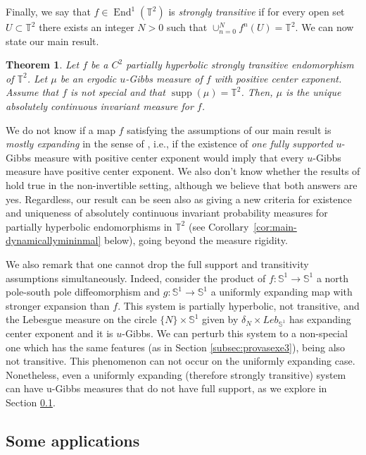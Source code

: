 \documentclass[a4paper,11pt,reqno]{amsart}
\newcommand{\TT}{{\mathbb{T}^2}}
\newtheorem{maintheorem}{Theorem}
\theoremstyle{definition}
\begin{document}
Finally, we say that $f\in\operatorname{End}^1(\TT)$ is \textit{strongly transitive} if for every open set $U\subset\TT$ there exists an integer $N>0$ such that {$\cup_{n = 0}^{N}f^n(U)=\TT$}. We can now state our main result.

\begin{maintheorem}
	\label{teo:main.rigidez}
Let $f$ be a $C^2$ partially hyperbolic strongly transitive endomorphism of $\TT$. Let $\mu$ be an ergodic $u$-Gibbs measure of $f$ with positive center exponent. Assume that $f$ is not special and that $\operatorname{supp}(\mu)=\TT$. Then, $\mu$ is the unique absolutely continuous invariant measure for $f$. 
\end{maintheorem}

We do not know if a map $f$ satisfying the assumptions of our main result is \emph{mostly expanding} in the sense of \cite{AndVas}, i.e., if the existence of \emph{one fully supported} $u$-Gibbs measure with positive center exponent would imply that every $u$-Gibbs measure have positive center exponent. We also don't know whether  the results of \cite{AndVas} hold true in the non-invertible setting, although we believe that both answers are yes. Regardless, our result can be seen also as giving a new criteria for existence and uniqueness of absolutely continuous invariant probability measures for partially hyperbolic endomorphisms in $\TT$ (see Corollary~\ref{cor:main-dynamicallymininmal} below), going beyond the measure rigidity.

We also remark that one cannot drop the full support and transitivity assumptions simultaneously. Indeed, consider the product of $f: \mathbb{S}^1 \to \mathbb{S}^1$ a north pole-south pole diffeomorphism and $g: \mathbb{S}^1 \to \mathbb{S}^1$ a uniformly expanding map with stronger expansion than $f$. This system is partially hyperbolic, not transitive, and the Lebesgue measure on the circle $\{N\} \times \mathbb{S}^1$ given by $\delta_N \times Leb_{\mathbb{S}^1}$ has expanding center exponent and it is $u$-Gibbs. We can perturb this system to a non-special one which has the same features (as in Section \ref{subsec:provasexe3}), being also not transitive. This phenomenon can not occur on the uniformly expanding case. Nonetheless, even a uniformly expanding (therefore strongly transitive) system can have u-Gibbs measures that do not have full support, as we explore in Section \ref{sec:ex}.

\subsection{Some applications}
\label{sec:ex}
\end{document}
